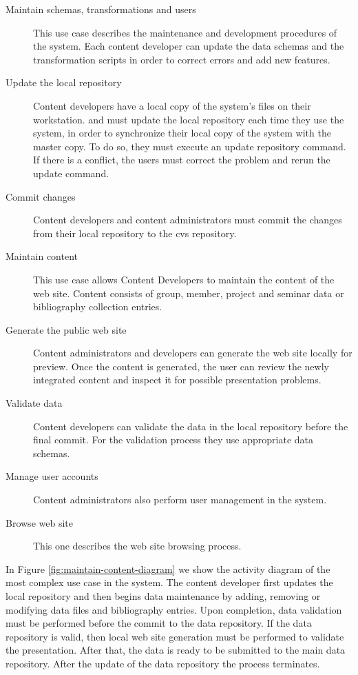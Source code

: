 \documentclass{elsart}
\begin{document}
\begin{description}
\item[Maintain schemas, transformations and users] This use case describes the 
maintenance and development procedures of the system. Each content developer can
update the data schemas and the transformation scripts in order to correct errors 
and add new features.

\item[Update the local repository] Content developers have a local copy of the system's files on their workstation. 
and must update the local repository each time they use the system, in order to synchronize their local copy of the system with the master copy. 
To do so, they must execute an update 
repository command. If there is a conflict, the users must correct the problem 
and rerun the update command.

\item[Commit changes] Content developers and content administrators must commit 
the changes from their local repository to the {\sc cvs} repository.

\item[Maintain content] This use case allows Content 
Developers to maintain the content of the web site. 
Content consists of group, member, project and seminar data or bibliography 
collection entries.

\item[Generate the public web site] Content administrators and developers can generate the 
web site locally for preview. Once the content is generated, 
the user can review the newly integrated content and inspect it
for possible presentation problems.

\item[Validate data] Content developers can validate the data in the local 
repository before the final commit. For the validation process
they use appropriate data schemas.

\item[Manage user accounts] Content administrators also perform user management in the 
system.

\item[Browse web site] This one describes the web site browsing process.

\end{description} 

In Figure \ref{fig:maintain-content-diagram} we show the activity diagram of the 
most complex use case in the system. The content developer first updates the 
local repository and then begins data maintenance by adding, 
removing or modifying data files and bibliography entries. Upon completion, data 
validation must be performed before the commit to the data repository. If the data 
repository is valid, then local web site generation must be performed to validate the 
presentation. After that, the data is ready to be submitted to the main 
data repository. After the update of the data repository the process terminates.
\end{document}
